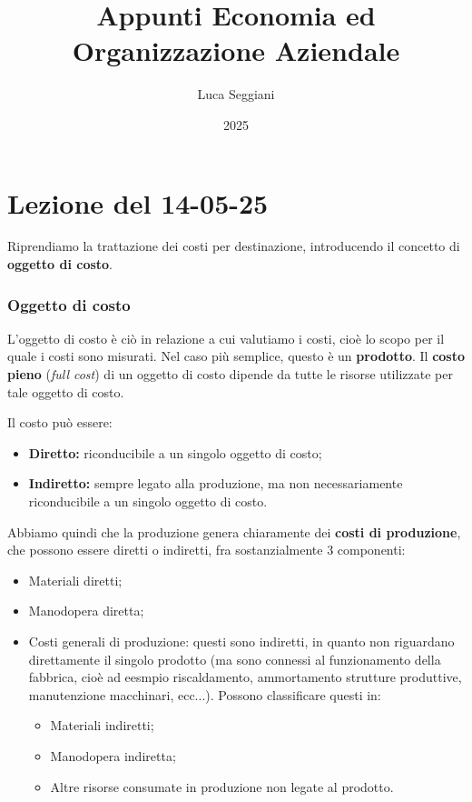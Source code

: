 \documentclass[a4paper,11pt]{article}
\title{Appunti Economia ed Organizzazione Aziendale}
\author{Luca Seggiani}
\date{2025}
\begin{document}
\section{Lezione del 14-05-25}

\thispagestyle{empty}
\pagestyle{fancy}

Riprendiamo la trattazione dei costi per destinazione, introducendo il concetto di \textbf{oggetto di costo}.

\subsubsection{Oggetto di costo}
L'oggetto di costo è ciò in relazione a cui valutiamo i costi, cioè lo scopo per il quale i costi sono misurati.
Nel caso più semplice, questo è un \textbf{prodotto}.
Il \textbf{costo pieno} (\textit{full cost}) di un oggetto di costo dipende da tutte le risorse utilizzate per tale oggetto di costo.

Il costo può essere:
\begin{itemize}
	\item \textbf{Diretto:} riconducibile a un singolo oggetto di costo;
	\item \textbf{Indiretto:} sempre legato alla produzione, ma non necessariamente riconducibile a un singolo oggetto di costo.
\end{itemize}

Abbiamo quindi che la produzione genera chiaramente dei \textbf{costi di produzione}, che possono essere diretti o indiretti, fra sostanzialmente 3 componenti:
\begin{itemize}
	\item Materiali diretti;
	\item Manodopera diretta;
	\item Costi generali di produzione: questi sono indiretti, in quanto non riguardano direttamente il singolo prodotto (ma sono connessi al funzionamento della fabbrica, cioè ad eesmpio riscaldamento, ammortamento strutture produttive, manutenzione macchinari, ecc...).
		Possono classificare questi in:
		\begin{itemize}
			\item Materiali indiretti;
			\item Manodopera indiretta;
			\item Altre risorse consumate in produzione non legate al prodotto.
		\end{itemize}
\end{itemize}
\end{document}
